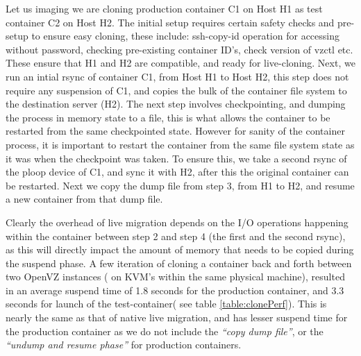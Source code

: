 Let us imaging we are cloning production container C1 on Host H1 as test container C2 on Host H2. 
The initial setup requires certain safety checks and pre-setup to ensure easy cloning, these include: ssh-copy-id operation for accessing without password, checking pre-existing container ID's, check version of vzctl etc. 
These ensure that H1 and H2 are compatible, and ready for live-cloning.
Next, we run an intial rsync of container C1, from Host H1 to Host H2, this step does not require any suspension of C1, and copies the bulk of the container file system to the destination server (H2). 
The next step involves checkpointing, and dumping the process in memory state to a file, this is what allows the container to be restarted from the same checkpointed state. 
However for sanity of the container process, it is important to restart the container from the same file system state as it was when the checkpoint was taken.
To ensure this, we take a second rsync of the ploop device of C1, and sync it with H2, after this the original container can be restarted.
Next we copy the dump file from step 3, from H1 to H2, and resume a new container from that dump file.

Clearly the overhead of live migration depends on the I/O operations happening within the container between step 2 and step 4 (the first and the second rsync), as this will directly impact the amount of memory that needs to be copied during the suspend phase. 
A few iteration of cloning a container back and forth between two OpenVZ instances ( on KVM's within the same physical machine), resulted in an average suspend time of 1.8 seconds for the production container, and 3.3 seconds for launch of the test-container( see table \ref{table:clonePerf}).
This is nearly the same as that of native live migration\cite{openvzLiveMigrationPerf}, and has lesser suspend time for the production container as we do not include the \textit{``copy dump file''}, or the \textit{``undump and resume phase''} for production containers. 


